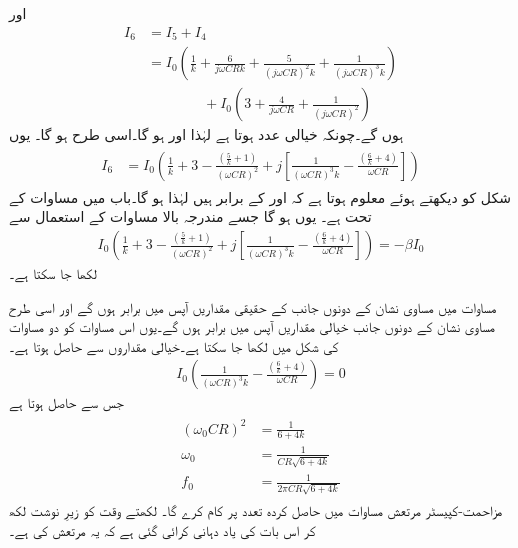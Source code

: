 اور
\begin{align*}
I_6 &=I_5 + I_4 \\
&=I_0 \left(\frac{1}{k}+\frac{6}{j \omega C R k}+\frac{5}{\left(j \omega C  R\right )^2 k} +\frac{1}{\left(j \omega C  R\right )^3 k}\right) \\
& \qquad \qquad +I_0 \left(3+\frac{4}{j \omega C R}+\frac{1}{\left (j \omega C R \right )^2} \right)
\end{align*}
ہوں گے۔چونکہ خیالی عدد  ہوتا ہے لہٰذا  اور  ہو گا۔اسی طرح  ہو گا۔ یوں
\begin{gather}
\begin{aligned} \label{مساوات_مزاحمت_کپیسٹر_بار_کی_رو}
I_6&=I_0 \left( \frac{1}{k}+3 -\frac{\left(\frac{5}{k}+1 \right )}{\left(\omega C R \right)^2}+j \left [\frac{1}{\left (\omega C R \right)^3 k}  -\frac{\left(\frac{6}{k}+4 \right)}{\omega C R}\right] \right )
\end{aligned}
\end{gather}
شکل کو دیکھتے ہوئے معلوم ہوتا ہے کہ  اور  کے برابر ہیں لہٰذا  ہو گا۔باب  میں مساوات  کے تحت  ہے۔ یوں  ہو گا جسے مندرجہ بالا مساوات کے استعمال سے
\begin{align} \label{مساوات_مزاحمت_کپیسٹر_مکمل_مساوت}
I_0 \left( \frac{1}{k}+3 -\frac{\left(\frac{5}{k}+1 \right )}{\left(\omega C R \right)^2}+j \left [\frac{1}{\left (\omega C R \right)^3 k}  -\frac{\left(\frac{6}{k}+4 \right)}{\omega C R}\right] \right )=-\beta I_0
\end{align}
لکھا جا سکتا ہے۔

مساوات  میں مساوی نشان کے دونوں جانب کے حقیقی مقداریں آپس میں برابر ہوں گے اور اسی طرح مساوی نشان کے دونوں جانب خیالی مقداریں آپس میں برابر ہوں گے۔یوں اس مساوات کو دو مساوات کی شکل میں لکھا جا سکتا ہے۔خیالی مقداروں سے حاصل ہوتا ہے۔
\begin{align*}
I_0 \left(\frac{1}{\left( \omega C R\right)^3 k }-\frac{\left(\frac{6}{k}+4 \right)}{\omega C R} \right)=0
\end{align*}
جس سے حاصل ہوتا ہے
\begin{gather}
\begin{aligned} \label{مساوات_مزاحمت_کپیسٹر_مرتعش_قدرتی_تعداد_ارتعاش}
\left(\omega_0 C R \right)^2 &=\frac{1}{ {6+4 k}}\\
\omega_0 &= \frac{1}{C R \sqrt {6+4 k}} \\
f_0 &=\frac{1}{2 \pi C R \sqrt{6+4 k}}
\end{aligned}
\end{gather}
مزاحمت-کپیسٹر مرتعش مساوات  میں حاصل کردہ تعدد  پر کام کرے گا۔ لکھتے وقت  کو زیرِ نوشت لکھ کر اس بات کی یاد دہانی کرائی گئی ہے کہ یہ مرتعش کی  ہے۔ 

